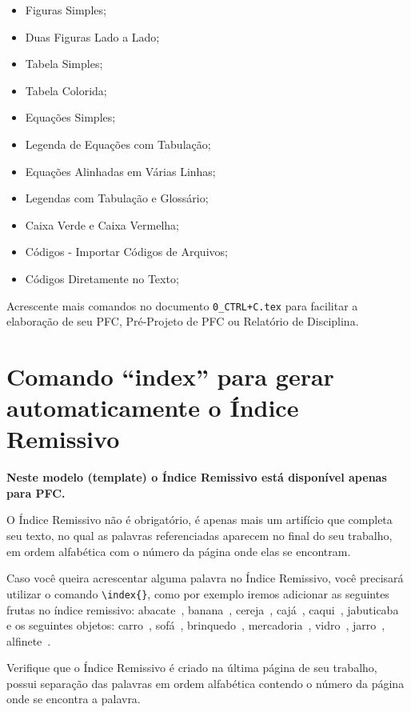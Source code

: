 \begin{itemize}
    \item Figuras Simples;
    \item Duas Figuras Lado a Lado;
    \item Tabela Simples;
    \item Tabela Colorida;
    \item Equações Simples;
    \item Legenda de Equações com Tabulação;
    \item Equações Alinhadas em Várias Linhas;
    \item Legendas com Tabulação e Glossário;
    \item Caixa Verde e Caixa Vermelha;
    \item Códigos - Importar Códigos de Arquivos;
    \item Códigos Diretamente no Texto; 
\end{itemize}

Acrescente mais comandos no documento \verb|0_CTRL+C.tex| para facilitar a elaboração de seu PFC, Pré-Projeto de PFC ou Relatório de Disciplina.
    
\newpage\clearpage\pagebreak

\section{Comando ``index'' para gerar automaticamente o Índice Remissivo}

{\bf Neste modelo (template) o Índice Remissivo está disponível apenas para PFC.}

O Índice Remissivo não é obrigatório, é apenas mais um artifício que completa seu texto, no qual as palavras referenciadas aparecem no final do seu trabalho, em ordem alfabética com o número da página onde elas se encontram.

Caso você queira acrescentar alguma palavra no Índice Remissivo, você precisará utilizar o comando \verb|\index{}|, como por exemplo iremos adicionar as seguintes frutas no índice remissivo: abacate~, banana~, cereja~, cajá~, caqui~, jabuticaba~ e os seguintes objetos: carro~, sofá~, brinquedo~, mercadoria~, vidro~, jarro~, alfinete~.

Verifique que o Índice Remissivo é criado na última página de seu trabalho, possui separação das palavras em ordem alfabética contendo o número da página onde se encontra a palavra.

